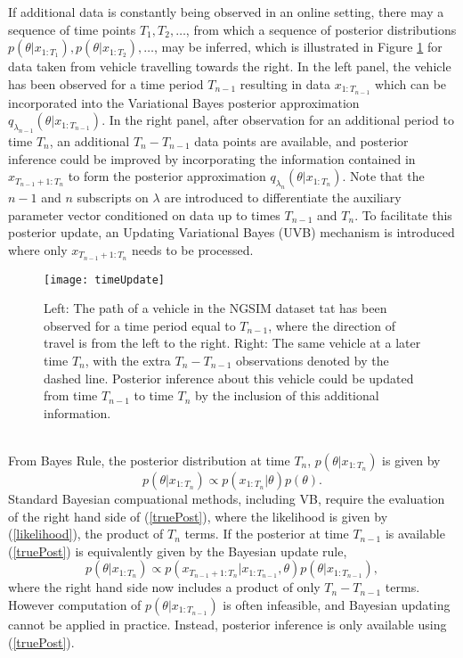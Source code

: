 \documentclass[12pt,a4paper]{article}\usepackage[]{graphicx}\usepackage[]{color}
\begin{document}
If additional data is constantly being observed in an online setting, there may a sequence of time points $T_1, T_2, \dots$, from which a sequence of posterior distributions $p(\theta | x_{1:T_1}), p(\theta | x_{1:T_2}), \dots$, may be inferred, which is illustrated in Figure \ref{fig:timeUpdate} for data taken from vehicle travelling towards the right. In the left panel, the vehicle has been observed for a time period $T_{n-1}$ resulting in data $x_{1:T_{n-1}}$ which can be incorporated into the Variational Bayes posterior approximation $q_{\lambda_{n-1}}(\theta | x_{1:T_{n-1}})$. In the right panel, after observation for an additional period to time $T_{n}$, an additional $T_{n} - T_{n-1}$ data points are available, and posterior inference could be improved by incorporating the information contained in $x_{T_{n-1}+1:T_{n}}$ to form the posterior approximation $q_{\lambda_{n}}(\theta | x_{1:T_{n}})$. Note that the $n-1$ and $n$ subscripts on $\lambda$ are introduced to differentiate the auxiliary parameter vector conditioned on data up to times $T_{n-1}$ and $T_{n}$. To facilitate this posterior update, an Updating Variational Bayes (UVB) mechanism is introduced where only $x_{T_{n-1}+1:T_{n}}$ needs to be processed.
\begin{figure}[ht]
\centering
\texttt{[image: timeUpdate]}
\caption{Left: The path of a vehicle in the NGSIM dataset tat has been observed for a time period equal to $T_{n-1}$, where the direction of travel is from the left to the right. Right: The same vehicle at a later time $T_{n}$, with the extra $T_{n} - T_{n-1}$ observations denoted by the dashed line. Posterior inference about this vehicle could be updated from time $T_{n-1}$ to time $T_{n}$ by the inclusion of this additional information.}
\label{fig:timeUpdate}
\end{figure}
\\

From Bayes Rule, the posterior distribution at time $T_{n}$, $p(\theta | x_{1:T_{n}})$ is given by
\begin{equation}
\label{truePost}
p(\theta | x_{1:T_n}) \propto p(x_{1:T_n} | \theta)p(\theta).
\end{equation}
Standard Bayesian compuational methods, including VB, require the evaluation of the right hand side of (\ref{truePost}), where the likelihood is given by (\ref{likelihood}), the product of $T_n$ terms. If the posterior at time $T_{n-1}$ is available (\ref{truePost}) is equivalently given by the Bayesian update rule,
\begin{equation}
\label{updatePost}
p(\theta | x_{1:T_{n}}) \propto p(x_{T_{n-1}+1:T_{n}} | x_{1:T_{n-1}}, \theta)p(\theta | x_{1:T_{n-1}}),
\end{equation}
where the right hand side now includes a product of only $T_{n} - T_{n-1}$ terms. However computation of $p(\theta | x_{1:T_{n-1}})$ is often infeasible, and Bayesian updating cannot be applied in practice. Instead, posterior inference is only available using (\ref{truePost}). 
\end{document}
